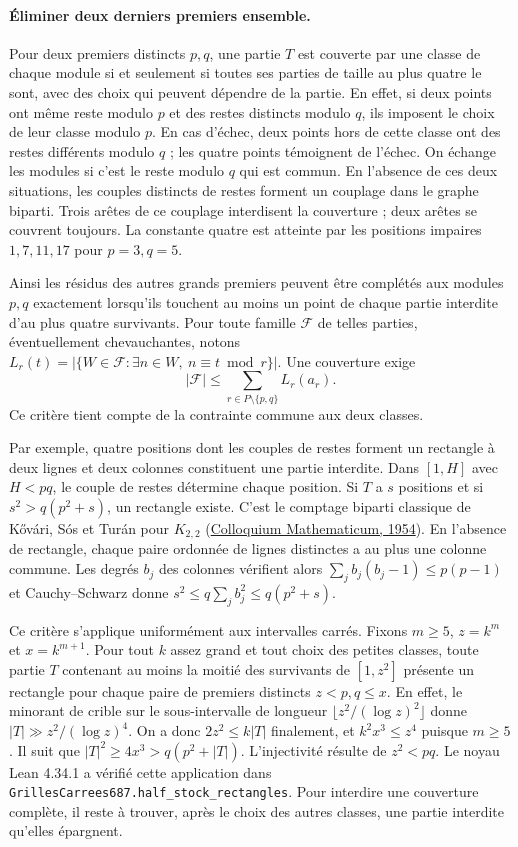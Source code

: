 \documentclass[11pt,a4paper]{article}
\begin{document}
\paragraph{Éliminer deux derniers premiers ensemble.}
Pour deux premiers distincts $p,q$, une partie $T$ est couverte par une
classe de chaque module si et seulement si toutes ses parties de taille
au plus quatre le sont, avec des choix qui peuvent dépendre de la partie.
En effet, si deux points ont même reste modulo $p$ et des restes
distincts modulo $q$, ils imposent le choix de leur classe modulo $p$.
En cas d'échec, deux points hors de cette classe ont des restes différents
modulo $q$ ; les quatre points témoignent de l'échec. On échange les
modules si c'est le reste modulo $q$ qui est commun. En l'absence de ces
deux situations, les couples distincts de restes forment un couplage
dans le graphe biparti. Trois arêtes de ce couplage interdisent la
couverture ; deux arêtes se couvrent toujours. La constante quatre est
atteinte par les positions impaires $1,7,11,17$ pour $p=3,q=5$.

Ainsi les résidus des autres grands premiers peuvent être complétés
aux modules $p,q$ exactement lorsqu'ils touchent au moins un point de
chaque partie interdite d'au plus quatre survivants. Pour toute famille
$\mathcal F$ de telles parties, éventuellement chevauchantes, notons
$L_r(t)=|\{W\in\mathcal F:\exists n\in W,\ n\equiv t\bmod r\}|$.
Une couverture exige
\[
 |\mathcal F|\le \sum_{r\in P\setminus\{p,q\}} L_r(a_r).
\]
Ce critère tient compte de la contrainte commune aux deux classes.

Par exemple, quatre positions dont les couples de restes forment un
rectangle à deux lignes et deux colonnes constituent une partie interdite.
Dans $[1,H]$ avec $H<pq$, le couple de restes détermine chaque position.
Si $T$ a $s$ positions et si $s^2>q(p^2+s)$, un rectangle existe.
C'est le comptage biparti classique de K\H{o}vári, Sós et Turán pour
$K_{2,2}$ (\href{https://doi.org/10.4064/cm-3-1-50-57}{Colloquium Mathematicum, 1954}).
En l'absence de rectangle, chaque paire ordonnée de lignes distinctes
a au plus une colonne commune. Les degrés $b_j$ des colonnes vérifient
alors $\sum_j b_j(b_j-1)\le p(p-1)$ et Cauchy--Schwarz donne
$s^2\le q\sum_j b_j^2\le q(p^2+s)$.

Ce critère s'applique uniformément aux intervalles carrés. Fixons
$m\ge5$, $z=k^m$ et $x=k^{m+1}$. Pour tout $k$ assez grand et
tout choix des petites classes, toute partie $T$ contenant au moins
la moitié des survivants de $[1,z^2]$ présente un rectangle pour
chaque paire de premiers distincts $z<p,q\le x$. En effet, le minorant
de crible sur le sous-intervalle de longueur
$\lfloor z^2/(\log z)^2\rfloor$ donne $|T|\gg z^2/(\log z)^4$.
On a donc $2z^2\le k|T|$ finalement, et $k^2x^3\le z^4$ puisque
$m\ge5$. Il suit que $|T|^2\ge4x^3>q(p^2+|T|)$. L'injectivité
résulte de $z^2<pq$. Le noyau Lean 4.34.1 a vérifié cette application
dans \texttt{GrillesCarrees687.half\_stock\_rectangles}.
Pour interdire une couverture complète, il reste à trouver, après le
choix des autres classes, une partie interdite qu'elles épargnent.
\end{document}
